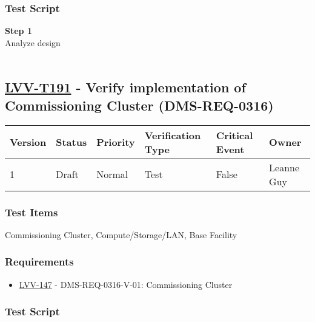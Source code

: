 \hypertarget{test-script-167}{%
\subsubsection{Test Script}\label{test-script-167}}

\textbf{Step 1}\\
Analyze design\\
~\\

\hypertarget{lvv-t191---verify-implementation-of-commissioning-cluster-dms-req-0316}{%
\subsection{\texorpdfstring{\href{https://jira.lsstcorp.org/secure/Tests.jspa\#/testCase/LVV-T191}{LVV-T191}
- Verify implementation of Commissioning Cluster
(DMS-REQ-0316)}{LVV-T191 - Verify implementation of Commissioning Cluster (DMS-REQ-0316)}}\label{lvv-t191---verify-implementation-of-commissioning-cluster-dms-req-0316}}

\begin{longtable}[]{@{}llllll@{}}
\toprule
Version & Status & Priority & Verification Type & Critical Event &
Owner\tabularnewline
\midrule
\endhead
1 & Draft & Normal & Test & False & Leanne Guy\tabularnewline
\bottomrule
\end{longtable}

\hypertarget{test-items-167}{%
\subsubsection{Test Items}\label{test-items-167}}

Commissioning Cluster, Compute/Storage/LAN, Base Facility~

\hypertarget{requirements-168}{%
\subsubsection{Requirements}\label{requirements-168}}

\begin{itemize}
\tightlist
\item
  \href{https://jira.lsstcorp.org/browse/LVV-147}{LVV-147} -
  DMS-REQ-0316-V-01: Commissioning Cluster
\end{itemize}

\hypertarget{test-script-168}{%
\subsubsection{Test Script}\label{test-script-168}}

